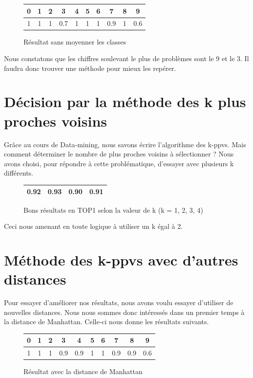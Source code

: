 \begin{figure}[h!]
\centering
\begin{tabular}{|*{10}{c|}}
    \hline
    0 & 1 & 2 & 3 & 4 & 5 & 6 & 7 & 8 & 9 \\
    \hline
    1 & 1 & 1 & 0.7 & 1 & 1 & 1 & 0.9 & 1 & 0.6  \\
    \hline
\end{tabular}
\caption{Résultat sans moyenner les classes}
\end{figure} 

Nous constatons que les chiffres soulevant le plus de problèmes sont 
le 9 et le 3. Il faudra donc trouver une méthode pour mieux les repérer.

\section{Décision par la méthode des k plus proches voisins}

Grâce au cours de Data-mining, nous savons écrire l'algorithme des k-ppvs.
Mais comment déterminer le nombre de plus proches voisins à sélectionner ?
Nous avons choisi, pour répondre à cette problématique, d'essayer 
avec plusieurs k différents. 

\begin{figure}[h!]
\centering
\begin{tabular}{|*{4}{c|}}
    \hline
    0.92 & 0.93 & 0.90 & 0.91 \\
    \hline
\end{tabular}
\caption{Bons résultats en TOP1 selon la valeur de k (k = 1, 2, 3, 4)}
\end{figure} 

Ceci nous amenant en toute logique à utiliser un k égal à 2.

\section{Méthode des k-ppvs avec d'autres distances}

Pour essayer d'améliorer nos résultats, nous avons voulu essayer
d'utiliser de nouvelles distances. Nous nous sommes donc intéressés
dans un premier temps à la distance de Manhattan. Celle-ci nous donne 
les résultats suivants.

\begin{figure}[h!]
\centering
\begin{tabular}{|*{10}{c|}}
    \hline
    0 & 1 & 2 & 3 & 4 & 5 & 6 & 7 & 8 & 9 \\
    \hline
    1 & 1 & 1 & 0.9 & 0.9 & 1 & 1 & 0.9 & 0.9 & 0.6  \\
    \hline
\end{tabular}
\caption{Résultat avec la distance de Manhattan}
\end{figure} 

